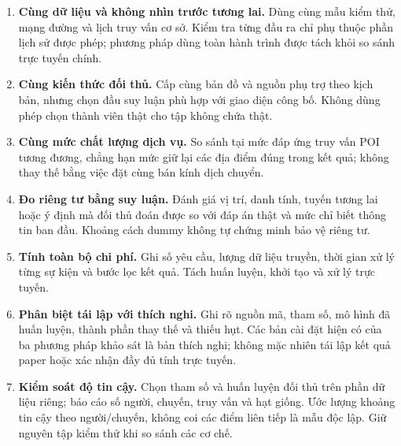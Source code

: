 \documentclass[12pt,a4paper,oneside]{report}
\begin{document}
\begin{enumerate}
  \item \textbf{Cùng dữ liệu và không nhìn trước tương lai.} Dùng cùng mẫu kiểm thử, mạng đường và lịch truy vấn cơ sở. Kiểm tra từng đầu ra chỉ phụ thuộc phần lịch sử được phép; phương pháp dùng toàn hành trình được tách khỏi so sánh trực tuyến chính.
  \item \textbf{Cùng kiến thức đối thủ.} Cấp cùng bản đồ và nguồn phụ trợ theo kịch bản, nhưng chọn đầu suy luận phù hợp với giao diện công bố. Không dùng phép chọn thành viên thật cho tập không chứa thật.
  \item \textbf{Cùng mức chất lượng dịch vụ.} So sánh tại mức đáp ứng truy vấn POI tương đương, chẳng hạn mức giữ lại các địa điểm đúng trong kết quả; không thay thế bằng việc đặt cùng bán kính dịch chuyển.
  \item \textbf{Đo riêng tư bằng suy luận.} Đánh giá vị trí, danh tính, tuyến tương lai hoặc ý định mà đối thủ đoán được so với đáp án thật và mức chỉ biết thông tin ban đầu. Khoảng cách dummy không tự chứng minh bảo vệ riêng tư.
  \item \textbf{Tính toàn bộ chi phí.} Ghi số yêu cầu, lượng dữ liệu truyền, thời gian xử lý từng sự kiện và bước lọc kết quả. Tách huấn luyện, khởi tạo và xử lý trực tuyến.
  \item \textbf{Phân biệt tái lập với thích nghi.} Ghi rõ nguồn mã, tham số, mô hình đã huấn luyện, thành phần thay thế và thiếu hụt. Các bản cài đặt hiện có của ba phương pháp khảo sát là bản thích nghi; không mặc nhiên tái lập kết quả paper hoặc xác nhận đầy đủ tính trực tuyến.
  \item \textbf{Kiểm soát độ tin cậy.} Chọn tham số và huấn luyện đối thủ trên phần dữ liệu riêng; báo cáo số người, chuyến, truy vấn và hạt giống. Ước lượng khoảng tin cậy theo người/chuyến, không coi các điểm liên tiếp là mẫu độc lập. Giữ nguyên tập kiểm thử khi so sánh các cơ chế.
\end{enumerate}




\end{document}
